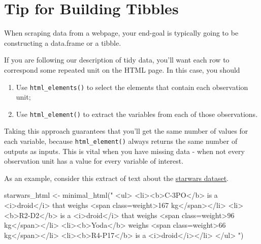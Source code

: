 \documentclass[
  12pt,
]{book}
\newenvironment{Shaded}{\begin{snugshade}}{\end{snugshade}}
\newcommand{\FunctionTok}[1]{\textcolor[rgb]{0.00,0.00,0.00}{#1}}
\newcommand{\NormalTok}[1]{#1}
\newcommand{\OtherTok}[1]{\textcolor[rgb]{0.56,0.35,0.01}{#1}}
\newcommand{\StringTok}[1]{\textcolor[rgb]{0.31,0.60,0.02}{#1}}
\providecommand{\tightlist}{%
  \setlength{\itemsep}{0pt}\setlength{\parskip}{0pt}}
\begin{document}
\hypertarget{tip-for-building-tibbles}{%
\section{Tip for Building Tibbles}\label{tip-for-building-tibbles}}

When scraping data from a webpage, your end-goal is typically going to be constructing a data.frame or a tibble.

If you are following our description of tidy data, you'll want each row to correspond some repeated unit on the HTML page. In this case, you should

\begin{enumerate}
\def\labelenumi{\arabic{enumi}.}
\tightlist
\item
  Use \texttt{html\_elements()} to select the elements that contain each observation unit;
\item
  Use \texttt{html\_element()} to extract the variables from each of those observations.
\end{enumerate}

Taking this approach guarantees that you'll get the same number of values for each variable, because \texttt{html\_element()} always returns the same number of outputs as inputs. This is vital when you have missing data - when not every observation unit has a value for every variable of interest.

As an example, consider this extract of text about the \href{https://dplyr.tidyverse.org/reference/starwars.html\#ref-examples}{starwars dataset}.

\begin{Shaded}
\begin{Highlighting}[]
\NormalTok{starwars\_html }\OtherTok{\textless{}{-}} \FunctionTok{minimal\_html}\NormalTok{(}\StringTok{"}
\StringTok{  \textless{}ul\textgreater{}}
\StringTok{    \textless{}li\textgreater{}\textless{}b\textgreater{}C{-}3PO\textless{}/b\textgreater{} is a \textless{}i\textgreater{}droid\textless{}/i\textgreater{} that weighs \textless{}span class=\textquotesingle{}weight\textquotesingle{}\textgreater{}167 kg\textless{}/span\textgreater{}\textless{}/li\textgreater{}}
\StringTok{    \textless{}li\textgreater{}\textless{}b\textgreater{}R2{-}D2\textless{}/b\textgreater{} is a \textless{}i\textgreater{}droid\textless{}/i\textgreater{} that weighs \textless{}span class=\textquotesingle{}weight\textquotesingle{}\textgreater{}96 kg\textless{}/span\textgreater{}\textless{}/li\textgreater{}}
\StringTok{    \textless{}li\textgreater{}\textless{}b\textgreater{}Yoda\textless{}/b\textgreater{} weighs \textless{}span class=\textquotesingle{}weight\textquotesingle{}\textgreater{}66 kg\textless{}/span\textgreater{}\textless{}/li\textgreater{}}
\StringTok{    \textless{}li\textgreater{}\textless{}b\textgreater{}R4{-}P17\textless{}/b\textgreater{} is a \textless{}i\textgreater{}droid\textless{}/i\textgreater{}\textless{}/li\textgreater{}}
\StringTok{  \textless{}/ul\textgreater{}}
\StringTok{  "}\NormalTok{)}
\end{Highlighting}
\end{Shaded}
\end{document}
